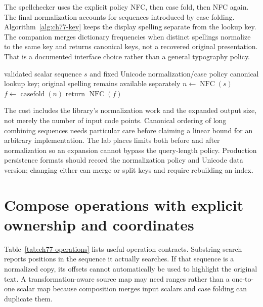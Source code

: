 The spellchecker uses the explicit policy NFC, then case fold, then NFC again.
The final normalization accounts for sequences introduced by case folding.
Algorithm~\ref{alg:ch77-key} keeps the display spelling separate from the lookup key.
The companion merges dictionary frequencies when distinct spellings normalize to the same key and returns canonical keys, not a recovered original presentation.
That is a documented interface choice rather than a general typography policy.

\begin{algorithm}[htbp]
\caption{Construct a caseless lookup key without changing the original text.}
\label{alg:ch77-key}
\begin{pseudocode}
\Require validated scalar sequence $s$ and fixed Unicode normalization/case policy
\Ensure canonical lookup key; original spelling remains available separately
\State $n\gets\operatorname{NFC}(s)$
\State $f\gets\operatorname{casefold}(n)$
\State return $\operatorname{NFC}(f)$
\end{pseudocode}
\end{algorithm}

The cost includes the library's normalization work and the expanded output size, not merely the number of input code points.
Canonical ordering of long combining sequences needs particular care before claiming a linear bound for an arbitrary implementation.
The lab places limits both before and after normalization so an expansion cannot bypass the query-length policy.
Production persistence formats should record the normalization policy and Unicode data version; changing either can merge or split keys and require rebuilding an index.

\section{Compose operations with explicit ownership and coordinates}
\label{sec:ch77-operations}
Table~\ref{tab:ch77-operations} lists useful operation contracts.
Substring search reports positions in the sequence it actually searches.
If that sequence is a normalized copy, its offsets cannot automatically be used to highlight the original text.
A transformation-aware source map may need ranges rather than a one-to-one scalar map because composition merges input scalars and case folding can duplicate them.

